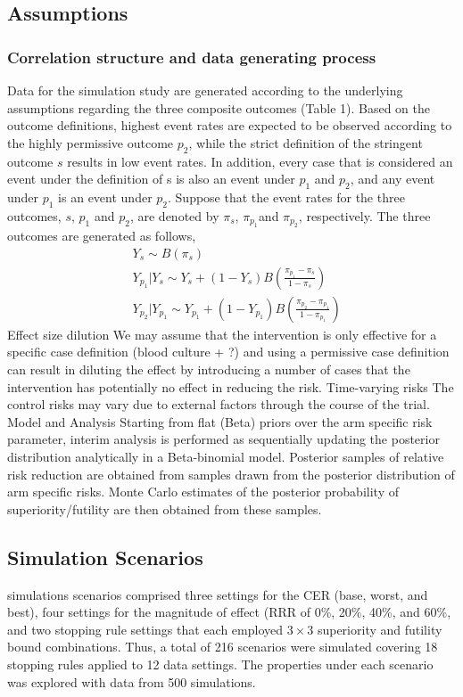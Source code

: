 \documentclass[12pt]{article}
\begin{document}
\subsection{Assumptions}
\subsubsection{Correlation structure and data generating process
}
Data for the simulation study are generated according to the underlying assumptions regarding the three composite outcomes (Table 1). Based on the outcome definitions, highest event rates are expected to be observed according to the highly permissive outcome $p_2$, while the strict definition of the stringent outcome $s$ results in low event rates. In addition, every case that is considered an event under the definition of s is also an event under $p_1$ and $p_2$, and any event under $p_1$ is an event under $p_2$. Suppose that the event rates for the three outcomes, $s$, $p_1$ and $p_2$, are denoted by $\pi_s$, $\pi_{p_1}$and $\pi_{p_2}$, respectively. The three outcomes are generated as follows,
\begin{align}
&Y_s\sim B( \pi_s )
\nonumber\\
&Y_{p_1} |Y_s\sim Y_s+(1-Y_s)B\left(\frac{\pi_{p_1}- \pi_s}{1-\pi_s}\right)\nonumber
\\
&Y_{p_2} |Y_{p_1}\sim Y_{p_1}+(1-Y_{p_1 })B\left(\frac{\pi_{p_2}- \pi_{p_1 }}{1-\pi_{p_1 } }\right)
\end{align}
Effect size dilution
We may assume that the intervention is only effective for a specific case definition (blood culture + ?) and using a permissive case definition can result in diluting the effect by introducing a number of cases that the intervention has potentially no effect in reducing the risk.
Time-varying risks
The control risks may vary due to external factors through the course of the trial. 
Model and Analysis
Starting from flat (Beta) priors over the arm specific risk parameter, interim analysis is performed as sequentially updating the posterior distribution analytically in a Beta-binomial model. Posterior samples of relative risk reduction are obtained from samples drawn from the posterior distribution of arm specific risks. Monte Carlo estimates of the posterior probability of superiority/futility are then obtained from these samples.
\subsection{Simulation Scenarios
}
simulations scenarios comprised three settings for the CER (base, worst, and best), four settings for the magnitude of effect (RRR of 0\%, 20\%, 40\%, and 60\%, and two stopping rule settings that each employed $3\times3$ superiority and futility bound combinations. Thus, a total of 216 scenarios were simulated covering 18 stopping rules applied to 12 data settings. The properties under each scenario was explored with data from 500 simulations.
\end{document}
